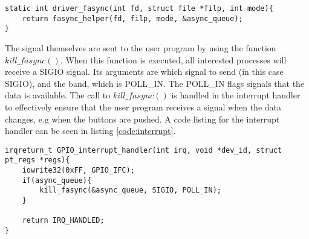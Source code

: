 \begin{lstlisting}[caption=Activate process as listener, label=code:async]
static int driver_fasync(int fd, struct file *filp, int mode){
    return fasync_helper(fd, filp, mode, &async_queue);
}
\end{lstlisting}





The signal themselves are sent to the user program by using the function $kill\_fasync()$. When this function is executed, all interested processes will receive a SIGIO signal. Its arguments are which signal to send (in this case SIGIO), and the band, which is POLL\_IN. The POLL\_IN flags signals that the data is available. The call to $kill\_fasync()$ is handled in the interrupt handler to effectively ensure that the user program receives a signal when the data changes, e.g when the buttons are pushed. A code listing for the interrupt handler can be seen in listing \ref{code:interrupt}.


\begin{lstlisting}[caption=Interrupt handler, label=code:interrupt]
irqreturn_t GPIO_interrupt_handler(int irq, void *dev_id, struct pt_regs *regs){
    iowrite32(0xFF, GPIO_IFC);
    if(async_queue){
        kill_fasync(&async_queue, SIGIO, POLL_IN);
    }
    
    return IRQ_HANDLED;
}
\end{lstlisting}



